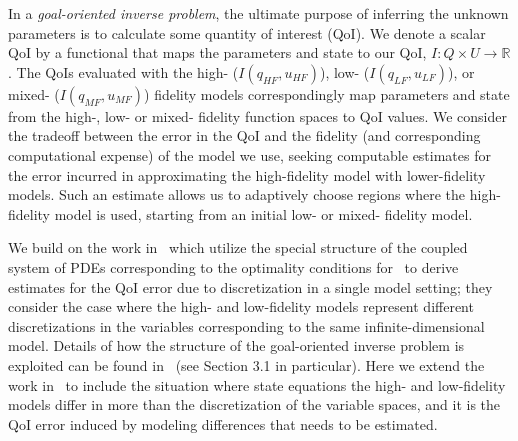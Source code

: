 \documentclass[review,sort&compress]{elsarticle}
\newcommand{\R}{{\mathbb{R}}}
\begin{document}
In a {\em goal-oriented inverse problem}, the ultimate purpose of inferring the unknown parameters is to calculate some quantity of interest (QoI). We denote a scalar QoI by a functional that maps the parameters and state to our QoI, $I:Q \times U \to \R$. The QoIs evaluated with the high- ($I(q_{HF},u_{HF})$), low- ($I(q_{LF},u_{LF})$), or mixed- ($I(q_{MF},u_{MF})$) fidelity models correspondingly map parameters and state from the high-, low- or mixed- fidelity function spaces to QoI values. We consider the tradeoff between the error in the QoI and the fidelity (and corresponding computational expense) of the model we use, seeking computable estimates for the error incurred in approximating the high-fidelity model with lower-fidelity models. Such an estimate allows us to adaptively choose regions where the high-fidelity model is used, starting from an initial low- or mixed- fidelity model.


We build on the work in~\cite{BecVex05, becker2004posteriori} which utilize the special structure of the coupled system of PDEs corresponding to the optimality conditions for~ to derive estimates for the QoI error due to discretization in a single model setting; they consider the case where the high- and low-fidelity models represent different discretizations in the variables corresponding to the same infinite-dimensional model. Details of how the structure of the goal-oriented inverse problem is exploited can be found in~\cite{becker2004posteriori} (see Section 3.1 in particular). Here we extend the work in~\cite{BecVex05} to include the situation where state equations the high- and low-fidelity models differ in more than the discretization of the variable spaces, and it is the QoI error induced by modeling differences that needs to be estimated.
\end{document}
